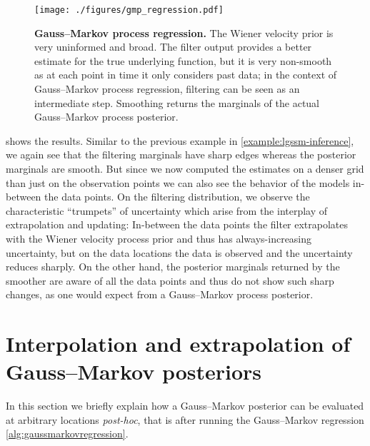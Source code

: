 \documentclass{mimosis}
\begin{document}
\begin{figure}[t]
\centering
\texttt{[image: ./figures/gmp\_regression.pdf]}
\caption{\label{fig:gmp_regression_example}\textbf{Gauss--Markov process regression.} The Wiener velocity prior is very uninformed and broad. The filter output provides a better estimate for the true underlying function, but it is very non-smooth as at each point in time it only considers past data; in the context of Gauss--Markov process regression, filtering can be seen as an intermediate step. Smoothing returns the marginals of the actual Gauss--Markov process posterior.}
\end{figure}

 shows the results.
Similar to the previous example in
\cref{example:lgssm-inference},
we again see that the filtering marginals have sharp edges
whereas the posterior marginals are smooth.
But since we now computed the estimates on a denser grid than just on the observation points we can also see the behavior of the models in-between the data points.
On the filtering distribution, we observe the characteristic ``trumpets'' of uncertainty which arise from the interplay of extrapolation and updating:
In-between the data points the filter extrapolates with the Wiener velocity process prior and thus has always-increasing uncertainty, but on the data locations the data is observed and the uncertainty reduces sharply.
On the other hand, the posterior marginals returned by the smoother are aware of all the data points and thus do not show such sharp changes, as one would expect from a Gauss--Markov process posterior.
\section{Interpolation and extrapolation of Gauss--Markov posteriors}
\label{sec:org8656a35}
\label{sec:gmp-interpolation-extrapolation}
In this section we briefly explain how a Gauss--Markov posterior can be evaluated at arbitrary locations \emph{post-hoc}, that is after running the Gauss--Markov regression \cref{alg:gaussmarkovregression}.
\end{document}

